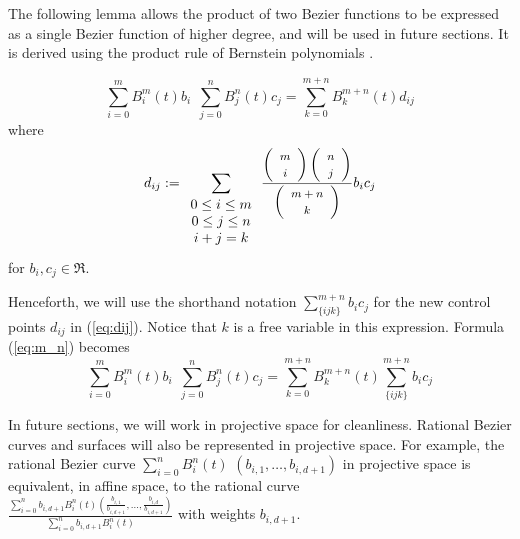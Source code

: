 The following lemma allows the product of two Bezier functions to be
expressed as a single Bezier function of higher degree, and will be
used in future sections.
It is derived using the product rule of Bernstein polynomials \cite{farin93}.

\begin{lemma}
\label{lem:product}
\begin{equation}
\label{eq:m_n}
\sum_{i=0}^{m} B_i^m(t) b_i \ \ \sum_{j=0}^{n} B_j^n(t) c_j
= \sum_{k=0}^{m+n} B_k^{m+n}(t) d_{ij}
\end{equation}
where
\begin{equation}
\label{eq:dij}
d_{ij} := \sum_{\begin{array}{c} 0 \leq i \leq m \\ 
			     0 \leq j \leq n \\ 
			     i+j=k
			     \end{array}}
	\frac{\left( \begin{array}{c} \mbox{\footnotesize{$m$}} \\ \mbox{\footnotesize{$i$}} \end{array} \right) \left( \begin{array}{c} \mbox{\footnotesize{$n$}} \\ \mbox{\footnotesize{$j$}} \end{array} \right)}{\left( \begin{array}{c} \mbox{\footnotesize{$m+n$}} \\ \mbox{\footnotesize{$k$}} \end{array} \right)}  b_i c_j
\end{equation}
for $b_i,c_j \in \Re$.
\end{lemma}

Henceforth, we will use the shorthand notation 
$\sum_{\{ijk\}}^{m+n} b_i c_j$ for the new control points $d_{ij}$
in (\ref{eq:dij}).
Notice that $k$ is a free variable in this expression.
Formula (\ref{eq:m_n}) becomes
\begin{equation}
\label{eq:shorthand}
\sum_{i=0}^{m} B_i^m(t) b_i \ \ \sum_{j=0}^{n} B_j^n(t) c_j
= \sum_{k=0}^{m+n} B_k^{m+n}(t) \sum_{\{ijk\}}^{m+n} b_i c_j
\end{equation}

In future sections,
we will work in projective space for cleanliness.
Rational Bezier curves and surfaces will also be represented in projective
space.
For example, the rational Bezier curve 
$\sum_{i=0}^{n} B_i^n(t)$ $(b_{i,1},\ldots,b_{i,d+1})$ in projective space is
equivalent, in affine space, to the rational curve \\
$\frac{\sum_{i=0}^{n} b_{i,d+1} B_i^n(t) 
	(\frac{b_{i,1}}{b_{i,d+1}},\ldots,\frac{b_{i,d}}{b_{i,d+1}})}
      {\sum_{i=0}^{n} b_{i,d+1} B_i^n(t)}$
with weights $b_{i,d+1}$.

